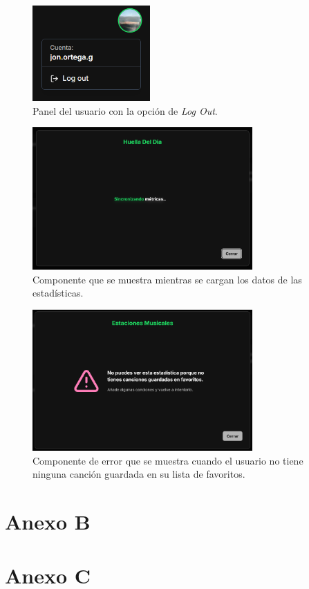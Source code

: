 \begin{figure}[H]
    \centering
    \vspace{-10pt}
    \includegraphics[width=0.4\textwidth]{figures/capturas_ui/user_action_panel.png}
    \caption{Panel del usuario con la opción de \textit{Log Out}.}
    \label{fig:user_action_panel}
\end{figure}

\begin{figure}[H]
    \centering
    \vspace{-10pt}
    \includegraphics[width=0.75\textwidth]{figures/capturas_ui/pantalla_carga.png}
    \caption{Componente que se muestra mientras se cargan los datos de las estadísticas.}
    \label{fig:pantalla_carga}
\end{figure}

\begin{figure}[H]
    \centering
    \vspace{-10pt}
    \includegraphics[width=0.75\textwidth]{figures/capturas_ui/error_no_favoritos.png}
    \caption{Componente de error que se muestra cuando el usuario no tiene ninguna canción guardada en su lista de favoritos.}
    \label{fig:error_no_favoritos}
\end{figure}

\chapter*{Anexo B} \label{ch:anexoB}

\chapter*{Anexo C} \label{ch:anexoC}
